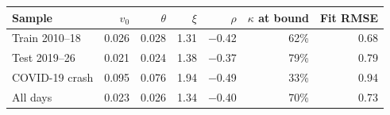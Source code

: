 \begin{tabular}{lrrrrrr}
\toprule
Sample & $v_0$ & $\theta$ & $\xi$ & $\rho$ & $\kappa$ at bound & Fit RMSE \\
\midrule
Train 2010--18 & 0.026 & 0.028 & 1.31 & $-$0.42 & 62\% & 0.68 \\
Test 2019--26 & 0.021 & 0.024 & 1.38 & $-$0.37 & 79\% & 0.79 \\
COVID-19 crash & 0.095 & 0.076 & 1.94 & $-$0.49 & 33\% & 0.94 \\
All days & 0.023 & 0.026 & 1.34 & $-$0.40 & 70\% & 0.73 \\
\bottomrule
\end{tabular}
